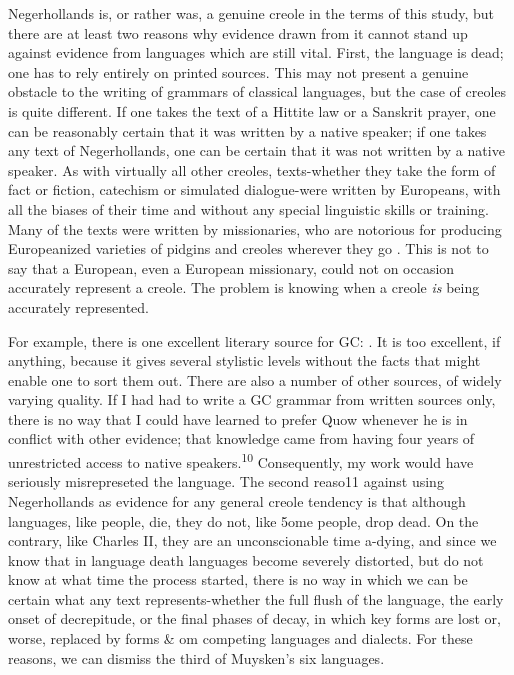 Negerhollands is, or rather was, a genuine creole in the terms of this study, but there are at least two reasons why evidence drawn from it cannot stand up against evidence from languages which are still vital. First, the language is dead; one has to rely entirely on printed sources. This may not present a genuine obstacle to the writing of grammars of classical languages, but the case of creoles is quite dif\-ferent. If one takes the text of a Hittite law or a Sanskrit prayer, one can be reasonably certain that it was written by a native speaker; if one takes any text of Negerhollands, one can be certain that it was not written by a native speaker. As with virtually all other creoles, texts-whether they take the form of fact or fiction, catechism or simulated dialogue-were written by Europeans, with all the biases of their time and without any special linguistic skills or training. Many of the texts were written by missionaries, who are notorious for pro\-ducing Europeanized varieties of pidgins and creoles wherever they go \citep{Voorhoeve1971}. This is not to say that a European, even a Euro\-pean missionary, could not on occasion accurately represent a creole. The problem is knowing when a creole \textit{is} being accurately represented.

For example, there is one excellent literary source for GC: \citet{Quow1877}. It is too excellent, if anything, because it gives several stylistic levels without the facts that might enable one to sort them out. There are also a number of other sources, of widely varying quality. If I had had to write a GC grammar from written sources only, there is no way that I could have learned to prefer Quow whenever he is in conflict with other evidence; that knowledge came from having four years of unrestricted access to native speakers.\textsuperscript{10} Consequently, my work would have seriously misrepreseted the language.
The second reaso11 against using Negerhollands as evidence for any general creole tendency is that although languages, like people, die, they do not, like 5ome people, drop dead. On the contrary, like Charles II, they are an unconscionable time a-dying, and since we know that in language death languages become severely distorted, but do not know at what time the process started, there is no way in which we can be certain what any text represents-whether the full flush of the lan\-guage, the early onset of decrepitude, or the final phases of decay, in which key forms are lost or, worse, replaced by forms \& om competing languages and dialects. For these reasons, we can dismiss the third of Muysken's six languages.

